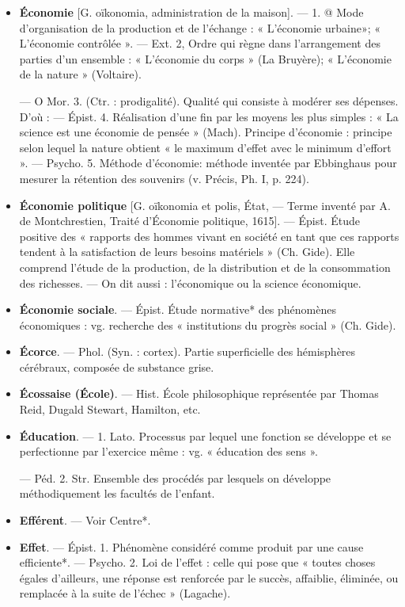 \begin{itemize}[leftmargin=1cm, label=, itemsep=1pt]
\item {\bf Économie} [G. oïkonomia, administration de la maison]. — 1. @ Mode
d'organisation de la production et
de l'échange : « L'économie urbaine»;
« L'économie contrôlée ». — Ext. 2,
Ordre qui règne dans l’arrangement
des parties d’un ensemble : « L’économie du corps » (La Bruyère);
« L’économie de la nature » (Voltaire).

— O Mor. 3. (Ctr. : prodigalité).
Qualité qui consiste à modérer ses
dépenses. D’où : — Épist. 4. Réalisation d’une fin par les moyens les
plus simples : « La science est une
économie de pensée » (Mach). Principe
d'économie : principe selon
lequel la nature obtient « le maximum d'effet avec le minimum d’effort ». — Psycho. 5. Méthode d’économie: méthode inventée par Ebbinghaus pour mesurer la rétention des
souvenirs (v. Précis, Ph. I, p. 224).

\item {\bf Économie politique} [G. oïkonomia et
polis, État, — Terme inventé par
A. de Montchrestien, Traité d'Économie politique, 1615]. — Épist.
Étude positive des « rapports des
hommes vivant en société en tant
que ces rapports tendent à la satisfaction de leurs besoins matériels »
(Ch. Gide). Elle comprend l'étude de
la production, de la distribution et
de la consommation des richesses. —
On dit aussi : l’économique ou la
science économique.

\item {\bf Économie sociale}. — Épist. Étude
normative* des phénomènes économiques : vg. recherche des « institutions du progrès social » (Ch. Gide).

\item {\bf Écorce}. — Phol. (Syn. : cortex). Partie
superficielle des hémisphères cérébraux, composée de substance grise.

\item {\bf Écossaise (École)}. — Hist. École
philosophique représentée par Thomas Reid, Dugald Stewart, Hamilton, etc.

\item {\bf Éducation}. — 1. Lato. Processus par
lequel une fonction se développe et
se perfectionne par l'exercice même :
vg. « éducation des sens ».

— Péd. 2. Str. Ensemble des
procédés par lesquels on développe
méthodiquement les facultés de
l'enfant.

\item {\bf Efférent}. — Voir Centre*.

\item {\bf Effet}. — Épist. 1. Phénomène considéré comme produit par une cause
efficiente*. — Psycho. 2. Loi de
l'effet : celle qui pose que « toutes
choses égales d’ailleurs, une réponse
est renforcée par le succès, affaiblie,
éliminée, ou remplacée à la suite de
l'échec » (Lagache).


\end{itemize}
